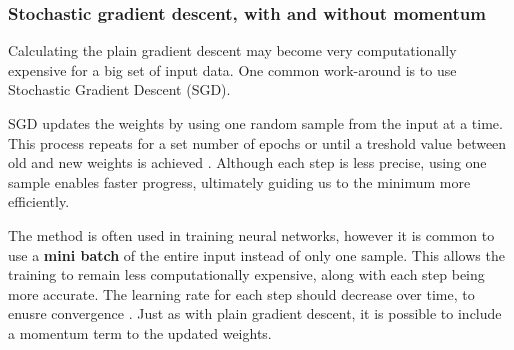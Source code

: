 \documentclass{article}
\begin{document}
\begin{multicols}{2}
\subsubsection*{Stochastic gradient descent, with and without momentum}

Calculating the plain gradient descent may become very computationally expensive for a big set of input data. One common work-around is to use Stochastic Gradient Descent (SGD).

SGD updates the weights by using one random sample from the input at a time. This process repeats for a set number of epochs or until a treshold value between old and new weights is achieved \cite{bhat_gradient_2020}. Although each step is less precise, using one sample enables faster progress, ultimately guiding us to the minimum more efficiently.

The method is often used in training neural networks, however it is common to use a \textbf{mini batch} of the entire input instead of only one sample. This allows the training to remain less computationally expensive, along with each step being more accurate.  The learning rate for each step should decrease over time, to enusre convergence \cite{goodfellow_deep_2016}. Just as with plain gradient descent, it is possible to include a momentum term to the updated weights. 

    

\end{multicols}
\end{document}
